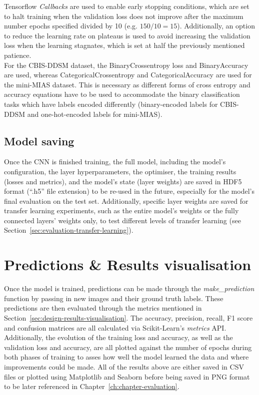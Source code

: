 Tensorflow \textit{Callbacks} are used to enable early stopping conditions, which are set to halt training when the validation loss does not improve after the maximum number epochs specified divided by 10 (e.g. $150/10=15$). Additionally, an option to reduce the learning rate on plateaus is used to avoid increasing the validation loss when the learning stagnates, which is set at half the previously mentioned patience.\\

For the CBIS-DDSM dataset, the BinaryCrossentropy loss and BinaryAccuracy are used, whereas CategoricalCrossentropy and CategoricalAccuracy are used for the mini-MIAS dataset. This is necessary as different forms of cross entropy and accuracy equations have to be used to accommodate the binary classification tasks which have labels encoded differently (binary-encoded labels for CBIS-DDSM and one-hot-encoded labels for mini-MIAS).

\subsection{Model saving}

Once the CNN is finished training, the full model, including the model's configuration, the layer hyperparameters, the optimiser, the training results (losses and metrics), and the model's state (layer weights) are saved in HDF5 format (``.h5'' file extension) to be re-used in the future, especially for the model's final evaluation on the test set. Additionally, specific layer weights are saved for transfer learning experiments, such as the entire model's weights or the fully connected layers' weights only, to test different levels of transfer learning (see Section~\ref{sec:evaluation-transfer-learning}).


\section{Predictions \& Results visualisation}

Once the model is trained, predictions can be made through the \textit{make\_prediction} function by passing in new images and their ground truth labels. These predictions are then evaluated through the metrics mentioned in Section~\ref{sec:design-results-visualisation}. The accuracy, precision, recall, F1 score and confusion matrices are all calculated via Scikit-Learn's \textit{metrics} API. Additionally, the evolution of the training loss and accuracy, as well as the validation loss and accuracy, are all plotted against the number of epochs during both phases of training to asses how well the model learned the data and where improvements could be made. All of the results above are either saved in CSV files or plotted using Matplotlib and Seaborn before being saved in PNG format to be later referenced in Chapter~\ref{ch:chapter-evaluation}.\\

